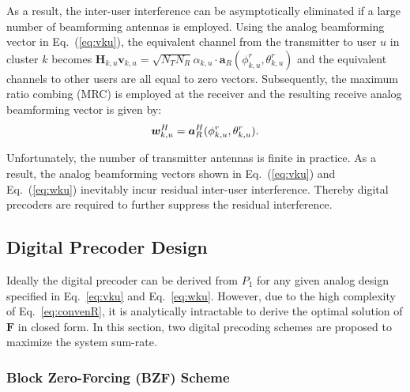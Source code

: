 \documentclass[conference]{IEEEtran}
\begin{document}
{As a result, the inter-user interference can be asymptotically eliminated if a large number of beamforming antennas is employed. Using the analog beamforming vector in Eq.~(\ref{eq:vku}), the equivalent channel from the transmitter to user $u$ in cluster $k$ becomes $\bm{H}_{k,u}\bm{v}_{k,u}=\sqrt{N_{T}N_{R}}\alpha_{k,u}\cdot \bm{a}_{R}(\phi^r_{k,u},\theta^r_{k,u})$ and the equivalent channels to other users are all equal to zero vectors. Subsequently, the maximum ratio combing (MRC) is employed at the receiver and the resulting receive analog beamforming vector is given by:
\begin{equation}
\bm{w}^H_{k,u}=\bm{a}_{R}^{H}(\phi^r_{k,u},\theta^r_{k,u}).\\
\label{eq:wku}
\end{equation}

Unfortunately, the number of transmitter antennas is finite in practice. As a result, the analog beamforming vectors shown in Eq.~(\ref{eq:vku}) and Eq.~(\ref{eq:wku}) inevitably incur residual inter-user interference. Thereby digital precoders are required to further suppress the residual interference.

\subsection{Digital Precoder Design}\label{digital}
Ideally the digital precoder can be derived from $P_1$ for any given analog design specified in Eq.~\eqref{eq:vku} and Eq.~\eqref{eq:wku}.
However, due to the high complexity of Eq.~\eqref{eq:convenR}, it is analytically intractable to derive the optimal solution of $\bm F$ in closed form. In this section, two digital precoding schemes are proposed to maximize the system sum-rate.

\subsubsection{Block Zero-Forcing (BZF) Scheme}

}
\end{document}
